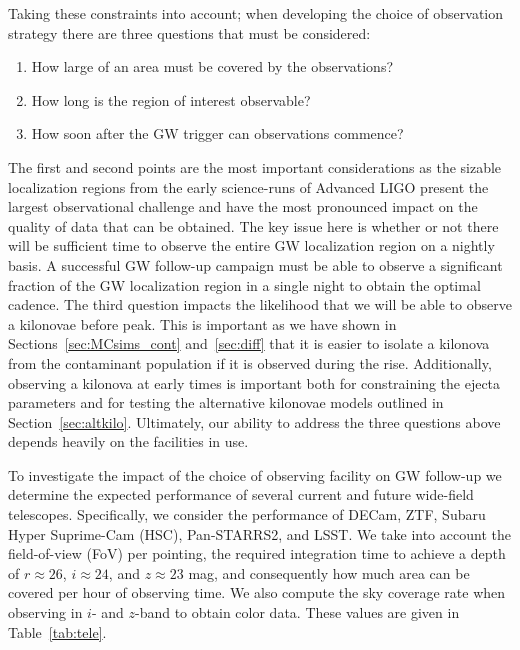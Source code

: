 Taking these constraints into account; when developing the choice of observation strategy there are three questions that must be considered:
\begin{enumerate}
\item How large of an area must be covered by the observations?
\item How long is the region of interest observable? 
\item How soon after the GW trigger can observations commence?
\end{enumerate}

The first and second points are the most important considerations as the sizable localization regions from the early science-runs of Advanced LIGO present the largest observational challenge and have the most pronounced impact on the quality of data that can be obtained. The key issue here is whether or not there will be sufficient time to observe the entire GW localization region on a nightly basis. A successful GW follow-up campaign must be able to observe a significant fraction of the GW localization region in a single night to obtain the optimal cadence. The third question impacts the likelihood that we will be able to observe a kilonovae before peak. This is important as we have shown in Sections~\ref{sec:MCsims_cont} and~\ref{sec:diff} that it is easier to isolate a kilonova from the contaminant population if it is observed during the rise. Additionally, observing a kilonova at early times is important both for constraining the ejecta parameters and for testing the alternative kilonovae models outlined in Section~\ref{sec:altkilo}. Ultimately, our ability to address the three questions above depends heavily on the facilities in use.

To investigate the impact of the choice of observing facility on GW follow-up we determine the expected performance of several current and future wide-field telescopes. Specifically, we consider the performance of DECam, ZTF, Subaru Hyper Suprime-Cam (HSC), Pan-STARRS2, and LSST. We take into account the field-of-view (FoV) per pointing, the required integration time to achieve a depth of $r\approx26$, $i\approx24$, and $z\approx23$ mag, and consequently how much area can be covered per hour of observing time. We also compute the sky coverage rate when observing in $i$- and $z$-band to obtain color data. These values are given in Table~\ref{tab:tele}. 


